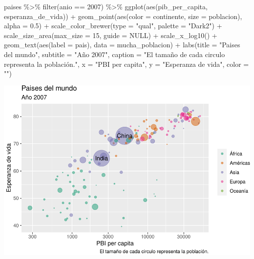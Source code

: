 \documentclass[
  openany]{book}
\newenvironment{Shaded}{\begin{snugshade}}{\end{snugshade}}
\newcommand{\AttributeTok}[1]{\textcolor[rgb]{0.77,0.63,0.00}{#1}}
\newcommand{\ConstantTok}[1]{\textcolor[rgb]{0.00,0.00,0.00}{#1}}
\newcommand{\DecValTok}[1]{\textcolor[rgb]{0.00,0.00,0.81}{#1}}
\newcommand{\FloatTok}[1]{\textcolor[rgb]{0.00,0.00,0.81}{#1}}
\newcommand{\FunctionTok}[1]{\textcolor[rgb]{0.00,0.00,0.00}{#1}}
\newcommand{\NormalTok}[1]{#1}
\newcommand{\SpecialCharTok}[1]{\textcolor[rgb]{0.00,0.00,0.00}{#1}}
\newcommand{\StringTok}[1]{\textcolor[rgb]{0.31,0.60,0.02}{#1}}
\begin{document}
\begin{Shaded}
\begin{Highlighting}[]
\NormalTok{paises }\SpecialCharTok{\%\textgreater{}\%} 
  \FunctionTok{filter}\NormalTok{(anio }\SpecialCharTok{==} \DecValTok{2007}\NormalTok{) }\SpecialCharTok{\%\textgreater{}\%} 
  \FunctionTok{ggplot}\NormalTok{(}\FunctionTok{aes}\NormalTok{(pib\_per\_capita, esperanza\_de\_vida)) }\SpecialCharTok{+}
  \FunctionTok{geom\_point}\NormalTok{(}\FunctionTok{aes}\NormalTok{(}\AttributeTok{color =}\NormalTok{ continente, }\AttributeTok{size =}\NormalTok{ poblacion), }\AttributeTok{alpha =} \FloatTok{0.5}\NormalTok{) }\SpecialCharTok{+}
  \FunctionTok{scale\_color\_brewer}\NormalTok{(}\AttributeTok{type =} \StringTok{"qual"}\NormalTok{, }\AttributeTok{palette =} \StringTok{"Dark2"}\NormalTok{) }\SpecialCharTok{+}
  \FunctionTok{scale\_size\_area}\NormalTok{(}\AttributeTok{max\_size =} \DecValTok{15}\NormalTok{, }\AttributeTok{guide =} \ConstantTok{NULL}\NormalTok{) }\SpecialCharTok{+}
  \FunctionTok{scale\_x\_log10}\NormalTok{() }\SpecialCharTok{+}
  \FunctionTok{geom\_text}\NormalTok{(}\FunctionTok{aes}\NormalTok{(}\AttributeTok{label =}\NormalTok{ pais), }\AttributeTok{data =}\NormalTok{ mucha\_poblacion) }\SpecialCharTok{+}
  \FunctionTok{labs}\NormalTok{(}\AttributeTok{title =} \StringTok{"Paises del mundo"}\NormalTok{,}
       \AttributeTok{subtitle =} \StringTok{"Año 2007"}\NormalTok{,}
       \AttributeTok{caption =} \StringTok{"El tamaño de cada circulo representa la población."}\NormalTok{,}
       \AttributeTok{x =} \StringTok{"PBI per capita"}\NormalTok{,}
       \AttributeTok{y =} \StringTok{"Esperanza de vida"}\NormalTok{,}
       \AttributeTok{color =} \StringTok{""}\NormalTok{)}
\end{Highlighting}
\end{Shaded}

\begin{center}\includegraphics[width=1\linewidth]{DT6_files/figure-latex/unnamed-chunk-137-1} \end{center}
\end{document}
